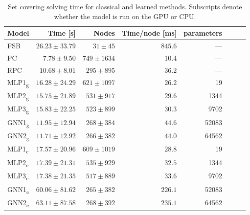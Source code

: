 \begin{scriptsize}
\begin{table}[ht]
	\centering
	\begin{tabular}{lrrrrrrr}
		\toprule
		Model & Time [s] & Nodes  & Time/node [ms] & parameters \\
		\midrule
		FSB & $26.23 \pm  33.79$ & $31 \pm 45$ & $845.6$ & ---\\
		PC  & $7.78 \pm 9.50$ & $749 \pm 1634$ & $10.4$ & ---\\
		RPC & $10.68 \pm 8.01$ & $295 \pm 895$ & $36.2$ & ---\\
		\addlinespace
		MLP1\textsubscript{g} & $ 16.28 \pm  24.29$ &  $ 621 \pm 1097$ &  $  26.2$ & 19\\
		MLP2\textsubscript{g} & $ 15.75 \pm  21.89$ &  $ 531 \pm  917$ &  $  29.6$ & 1344\\
		MLP3\textsubscript{g} & $ 15.83 \pm  22.25$ &  $ 523 \pm  899$ &  $  30.3$ & 9702\\
		GNN1\textsubscript{g} & $ 11.95 \pm  12.94$ &  $ 268 \pm  384$ &  $  44.6$  & 52083\\
		GNN2\textsubscript{g} & $ \mathbf{11.71 \pm  12.92}$ &  $ 266 \pm  382$ &  $  44.0$ & 64562\\
		\addlinespace
		MLP1\textsubscript{c} & $ 17.57 \pm  20.96$ &  $ 609 \pm 1019$ &  $  28.8$ & 19\\
		MLP2\textsubscript{c} & $ 17.39 \pm  21.31$ &  $ 535 \pm  929$ &  $  32.5$ & 1344\\
		MLP3\textsubscript{c} & $ 17.38 \pm  21.35$ &  $ 517 \pm  889$ &  $  33.6$ & 9702\\
		GNN1\textsubscript{c} & $ 60.06 \pm  81.62$ &  $ 265 \pm  382$ &  $ 226.1$ & 52083\\
		GNN2\textsubscript{c} & $ 63.11 \pm  87.58$ &  $ 268 \pm  392$ &  $ 235.1$ & 64562\\
		\bottomrule
	\end{tabular}
	\caption{Set covering solving time for classical and learned methods. Subscripts denote whether the model is run on the \gls{GPU} or \gls{CPU}.}\label{tab:results1_set}
\end{table}
\end{scriptsize}
